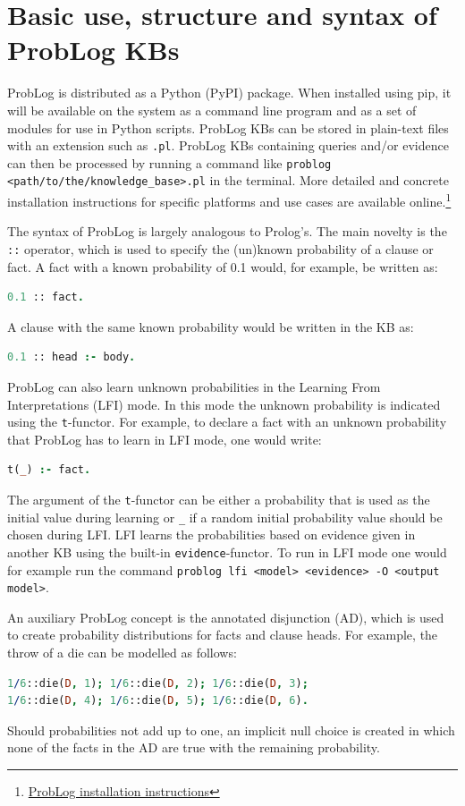\section{Basic use, structure and syntax of ProbLog KBs}
ProbLog is distributed as a Python (PyPI) package. When installed using pip, it will be available on the system as a command line program and as a set of modules for use in Python scripts. ProbLog KBs can be stored in plain-text files with an extension such as \texttt{.pl}. ProbLog KBs containing queries and/or evidence can then be processed by running a command like \lstinline[columns=fixed]{problog <path/to/the/knowledge_base>.pl} in the terminal. More detailed and concrete installation instructions for specific platforms and use cases are available online.\footnote{\href{https://problog.readthedocs.io/en/latest/install.html}{ProbLog installation instructions}}

The syntax of ProbLog is largely analogous to Prolog's. The main novelty is the \texttt{::} operator, which is used to specify the (un)known probability of a clause or fact. A fact with a known probability of 0.1 would, for example, be written as:
\begin{lstlisting}[language=Prolog]
0.1 :: fact.
\end{lstlisting}
A clause with the same known probability would be written in the KB as:
\begin{lstlisting}[language=Prolog]
0.1 :: head :- body.
\end{lstlisting}
ProbLog can also learn unknown probabilities in the Learning From Interpretations (LFI) mode. In this mode the unknown probability is indicated using the \texttt{t}-functor. For example, to declare a fact with an unknown probability that ProbLog has to learn in LFI mode, one would write:
\begin{lstlisting}[language=Prolog]
t(_) :- fact.
\end{lstlisting}
The argument of the \texttt{t}-functor can be either a probability that is used as the initial value during learning or \texttt{\_} if a random initial probability value should be chosen during LFI. LFI learns the probabilities based on evidence given in another KB using the built-in \texttt{evidence}-functor. To run in LFI mode one would for example run the command \lstinline[columns=fixed]{problog lfi <model> <evidence> -O <output model>}.

An auxiliary ProbLog concept is the annotated disjunction (AD), which is used to create probability distributions for facts and clause heads. For example, the throw of a die can be modelled as follows:
\begin{lstlisting}[language=Prolog]
1/6::die(D, 1); 1/6::die(D, 2); 1/6::die(D, 3);
1/6::die(D, 4); 1/6::die(D, 5); 1/6::die(D, 6).
\end{lstlisting}
Should probabilities not add up to one, an implicit null choice is created in which none of the facts in the AD are true with the remaining probability.

